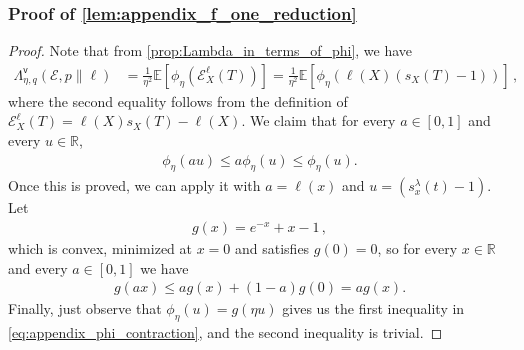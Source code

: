 \documentclass{article}
\theoremstyle{plain}
\theoremstyle{definition}
\theoremstyle{plain}
\newcommand{\R}{\mathbb R}
\newcommand{\E}{\mathbb E}
\newcommand{\cE}{\mathcal E}
\begin{document}
\subsubsection{Proof of \cref{lem:appendix_f_one_reduction}}
\label{proof:appendix_f_one_reduction}
\begin{proof}
    Note that from \cref{prop:Lambda_in_terms_of_phi}, we have
    \begin{align}
        \Lambda^{\mathsf{v}}_{\eta, q}(\cE, p \| \ell) & =
        \frac{1}{\eta^2}
        \E\left[
            \phi_\eta(\cE_X^\ell(T))
            \right]
        =
        \frac{1}{\eta^2}
        \E\left[
            \phi_\eta(\ell(X)(s_X(T) - 1))
            \right]\,,
    \end{align}
    where the second equality follows from the definition of $\cE_X^\ell(T) = \ell(X)s_X(T) - \ell(X)$.
    We claim that for every $a \in [0,1]$ and every $u \in \R$,
    \begin{align}
        \phi_\eta(au) \leq a \phi_\eta(u) \leq \phi_\eta(u).
        \label{eq:appendix_phi_contraction}
    \end{align}
    Once this is proved, we can apply it with $a=\ell(x)$ and $u=(s_x^\lambda(t)-1)$.
    Let
    \begin{align}
        g(x) = e^{-x} + x - 1\,,
    \end{align}
    which is convex, minimized at $x=0$ and satisfies $g(0)=0$, so for every $x \in \R$ and every $a \in [0,1]$ we have
    \begin{align}
        g(ax) \leq a g(x) + (1-a)g(0) = a g(x).
    \end{align}
    Finally, just observe that $\phi_\eta(u) = g(\eta u)$ gives us the first inequality in \cref{eq:appendix_phi_contraction}, and the second inequality is trivial.
\end{proof}
\end{document}
